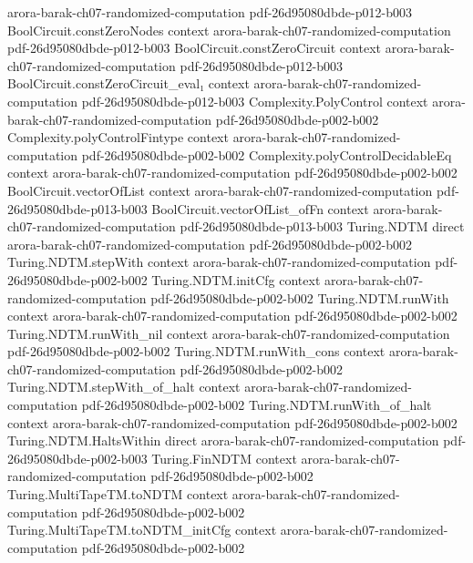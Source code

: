 \begin{theorem}
  {arora-barak-ch07-randomized-computation}
  {pdf-26d95080dbde-p012-b003}
\proofstep
  {BoolCircuit.constZeroNodes}
  {context}
  {arora-barak-ch07-randomized-computation}
  {pdf-26d95080dbde-p012-b003}
\proofstep
  {BoolCircuit.constZeroCircuit}
  {context}
  {arora-barak-ch07-randomized-computation}
  {pdf-26d95080dbde-p012-b003}
\proofstep
  {BoolCircuit.constZeroCircuit_eval₁}
  {context}
  {arora-barak-ch07-randomized-computation}
  {pdf-26d95080dbde-p012-b003}
\proofstep
  {Complexity.PolyControl}
  {context}
  {arora-barak-ch07-randomized-computation}
  {pdf-26d95080dbde-p002-b002}
\proofstep
  {Complexity.polyControlFintype}
  {context}
  {arora-barak-ch07-randomized-computation}
  {pdf-26d95080dbde-p002-b002}
\proofstep
  {Complexity.polyControlDecidableEq}
  {context}
  {arora-barak-ch07-randomized-computation}
  {pdf-26d95080dbde-p002-b002}
\proofstep
  {BoolCircuit.vectorOfList}
  {context}
  {arora-barak-ch07-randomized-computation}
  {pdf-26d95080dbde-p013-b003}
\proofstep
  {BoolCircuit.vectorOfList_ofFn}
  {context}
  {arora-barak-ch07-randomized-computation}
  {pdf-26d95080dbde-p013-b003}
\proofstep
  {Turing.NDTM}
  {direct}
  {arora-barak-ch07-randomized-computation}
  {pdf-26d95080dbde-p002-b002}
\proofstep
  {Turing.NDTM.stepWith}
  {context}
  {arora-barak-ch07-randomized-computation}
  {pdf-26d95080dbde-p002-b002}
\proofstep
  {Turing.NDTM.initCfg}
  {context}
  {arora-barak-ch07-randomized-computation}
  {pdf-26d95080dbde-p002-b002}
\proofstep
  {Turing.NDTM.runWith}
  {context}
  {arora-barak-ch07-randomized-computation}
  {pdf-26d95080dbde-p002-b002}
\proofstep
  {Turing.NDTM.runWith_nil}
  {context}
  {arora-barak-ch07-randomized-computation}
  {pdf-26d95080dbde-p002-b002}
\proofstep
  {Turing.NDTM.runWith_cons}
  {context}
  {arora-barak-ch07-randomized-computation}
  {pdf-26d95080dbde-p002-b002}
\proofstep
  {Turing.NDTM.stepWith_of_halt}
  {context}
  {arora-barak-ch07-randomized-computation}
  {pdf-26d95080dbde-p002-b002}
\proofstep
  {Turing.NDTM.runWith_of_halt}
  {context}
  {arora-barak-ch07-randomized-computation}
  {pdf-26d95080dbde-p002-b002}
\proofstep
  {Turing.NDTM.HaltsWithin}
  {direct}
  {arora-barak-ch07-randomized-computation}
  {pdf-26d95080dbde-p002-b003}
\proofstep
  {Turing.FinNDTM}
  {context}
  {arora-barak-ch07-randomized-computation}
  {pdf-26d95080dbde-p002-b002}
\proofstep
  {Turing.MultiTapeTM.toNDTM}
  {context}
  {arora-barak-ch07-randomized-computation}
  {pdf-26d95080dbde-p002-b002}
\proofstep
  {Turing.MultiTapeTM.toNDTM_initCfg}
  {context}
  {arora-barak-ch07-randomized-computation}
  {pdf-26d95080dbde-p002-b002}

\end{theorem}
